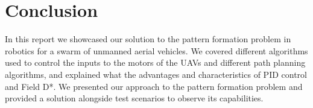 \chapter{Conclusion}

In this report we showcased our solution to the pattern formation problem in robotics
for a swarm of unmanned aerial vehicles. We covered different algorithms used to 
control the inputs to the motors of the UAVs and different path planning algorithms,
and explained what the advantages and characteristics of PID control and Field D*. 
We presented our approach to the pattern formation problem and provided a solution 
alongside test scenarios to observe its capabilities.

\printbibliography


